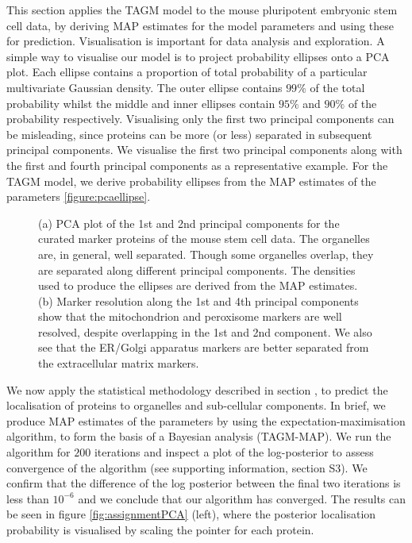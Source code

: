 \documentclass[10pt,letterpaper]{article}\usepackage[]{graphicx}\usepackage[]{color}
\begin{document}
This section applies the TAGM model to the mouse pluripotent embryonic
stem cell data, by deriving MAP estimates for the model parameters and
using these for prediction.  Visualisation is important for data
analysis and exploration. A simple way to visualise our model is to
project probability ellipses onto a PCA plot. Each ellipse contains a
proportion of total probability of a particular multivariate Gaussian
density.  The outer ellipse contains $99\%$ of the total probability
whilst the middle and inner ellipses contain $95\%$ and $90\%$ of the
probability respectively. Visualising only the first two principal
components can be misleading, since proteins can be more (or less)
separated in subsequent principal components.  We visualise the first two
principal components along with the first and fourth principal
components as a representative example. For the TAGM model, we derive
probability ellipses from the MAP estimates of the parameters \ref{figure:pcaellipse}.




\begin{figure}[!p]
  \begin{subfigure}[t]{0.45\textwidth}
    \centering

\end{subfigure}%
\hfill
\begin{subfigure}[t]{0.45\textwidth}
        \centering

\end{subfigure}
  \centering
  \caption{ (a) PCA plot of the 1st and 2nd principal components for
    the curated marker proteins of the mouse stem cell data. The
    organelles are, in general, well separated. Though some organelles
    overlap, they are separated along different principal
    components. The densities used to produce the ellipses are derived
    from the MAP estimates. (b) Marker resolution along the 1st and
    4th principal components show that the mitochondrion and
    peroxisome markers are well resolved, despite overlapping in the
    1st and 2nd component.  We also see that the ER/Golgi apparatus
    markers are better separated from the extracellular matrix
    markers.}
\label{figure::pcaellipse}
\end{figure}


We now apply the statistical methodology described in section
, to predict the localisation of proteins to
organelles and sub-cellular components. In brief, we produce MAP
estimates of the parameters by using the expectation-maximisation
algorithm, to form the basis of a Bayesian analysis (TAGM-MAP).  We
run the algorithm for $200$ iterations and inspect a plot of the
log-posterior to assess convergence of the algorithm (see supporting
information, section S3). We confirm that the difference of the log
posterior between the final two iterations is less than $10^{-6}$ and
we conclude that our algorithm has converged. The results can be seen
in figure \ref{fig:assignmentPCA} (left), where the posterior
localisation probability is visualised by scaling the pointer for each
protein.
\end{document}
